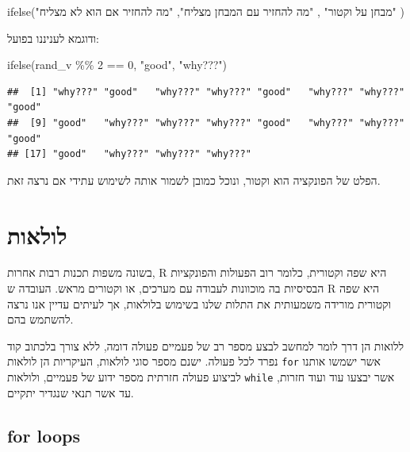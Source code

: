 \documentclass[
]{book}
\newenvironment{Shaded}{\begin{snugshade}}{\end{snugshade}}
\newcommand{\DecValTok}[1]{\textcolor[rgb]{0.00,0.00,0.81}{#1}}
\newcommand{\FunctionTok}[1]{\textcolor[rgb]{0.00,0.00,0.00}{#1}}
\newcommand{\NormalTok}[1]{#1}
\newcommand{\SpecialCharTok}[1]{\textcolor[rgb]{0.00,0.00,0.00}{#1}}
\newcommand{\StringTok}[1]{\textcolor[rgb]{0.31,0.60,0.02}{#1}}
\begin{document}
\begin{Shaded}
\begin{Highlighting}[]
\FunctionTok{ifelse}\NormalTok{(}\StringTok{"מבחן על וקטור"}\NormalTok{ ,}
       \StringTok{"מה להחזיר עם המבחן מצליח"}\NormalTok{,}
       \StringTok{"מה להחזיר אם הוא לא מצליח"}
\NormalTok{       )}
\end{Highlighting}
\end{Shaded}

ודוגמא לעניננו בפועל:

\begin{Shaded}
\begin{Highlighting}[]
\FunctionTok{ifelse}\NormalTok{(rand\_v }\SpecialCharTok{\%\%} \DecValTok{2} \SpecialCharTok{==} \DecValTok{0}\NormalTok{,}
       \StringTok{"good"}\NormalTok{,}
       \StringTok{"why???"}\NormalTok{)}
\end{Highlighting}
\end{Shaded}

\begin{verbatim}
##  [1] "why???" "good"   "why???" "why???" "good"   "why???" "why???" "good"  
##  [9] "good"   "why???" "why???" "why???" "good"   "why???" "why???" "good"  
## [17] "good"   "why???" "why???" "why???"
\end{verbatim}

הפלט של הפונקציה הוא וקטור, ונוכל כמובן לשמור אותה לשימוש עתידי אם נרצה זאת.

\hypertarget{ux5dcux5d5ux5dcux5d0ux5d5ux5ea}{%
\chapter{לולאות}\label{ux5dcux5d5ux5dcux5d0ux5d5ux5ea}}

בשונה משפות תכנות רבות אחרות,
R
היא שפה וקטורית,
כלומר רוב הפעולות והפונקציות הבסיסיות בה מוכוונות לעבודה עם מערכים, או וקטורים מראש. העובדה ש
R
היא שפה וקטורית מורידה משמעותית את התלות שלנו בשימוש בלולאות, אך לעיתים עדיין אנו נרצה להשתמש בהם.

ללואות הן דרך לומר למחשב לבצע מספר רב של פעמיים פעולה דומה, ללא צורך בלכתוב קוד נפרד לכל פעולה. ישנם מספר סוגי לולאות, העיקריות הן לולאות
\texttt{for}
אשר ישמשו אותנו לביצוע פעולה חזרתית מספר ידוע של פעמיים,
ולולאות
\texttt{while}
אשר יבצעו עוד ועוד חזרות, עד אשר תנאי שנגדיר יתקיים.

\hypertarget{for-loops}{%
\section{for loops}\label{for-loops}}
\end{document}
